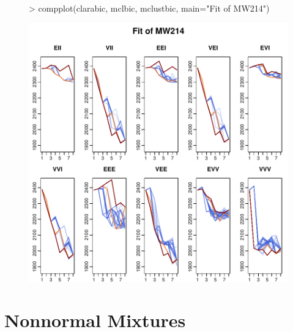\begin{figure}[h]
\begin{Schunk}
\begin{Sinput}
>     compplot(clarabic, mclbic, mclustbic, main="Fit of MW214")
\end{Sinput}
\end{Schunk}
\includegraphics{chapter3-figMW214bic}
\end{figure}

\section{Nonnormal Mixtures}

